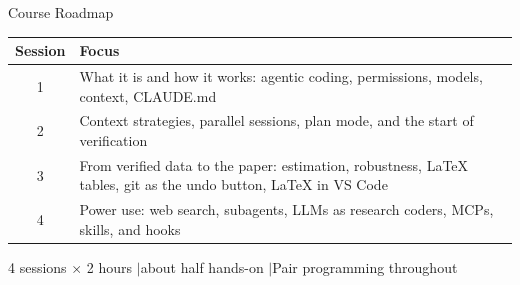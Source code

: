 \documentclass[aspectratio=169, 11pt]{beamer}
\begin{document}
\begin{frame}{Course Roadmap}
  \small
  \begin{tabular}{@{}c p{}@{}}
    \toprule
    \textbf{Session} & \textbf{Focus} \\
    \midrule
    1 & What it is and how it works: agentic coding, permissions, models, context, CLAUDE.md \\
    \midrule
    2 & Context strategies, parallel sessions, plan mode, and the start of verification \\
    \midrule
    3 & From verified data to the paper: estimation, robustness, \LaTeX{} tables, git as the undo button, \LaTeX{} in VS Code \\
    \midrule
    4 & Power use: web search, subagents, LLMs as research coders, MCPs, skills, and hooks \\
    \bottomrule
  \end{tabular}

  \vspace{0.6em}
  {\footnotesize 4 sessions $\times$ 2 hours \quad$\vert$\quad about half hands-on \quad$\vert$\quad Pair programming throughout}
\end{frame}
\end{document}
